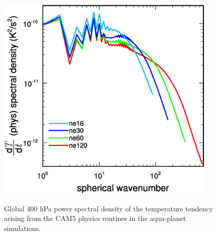 \begin{figure}
\begin{center}
\noindent\includegraphics[width=25pc,angle=0]{chapter3/SFigure1.eps}\\
\end{center}
\caption{Global 400 hPa power spectral density of the temperature tendency arising from the CAM5 physics routines in the aqua-planet simulations.}
\label{fig:sfigure3-1}
\end{figure}

